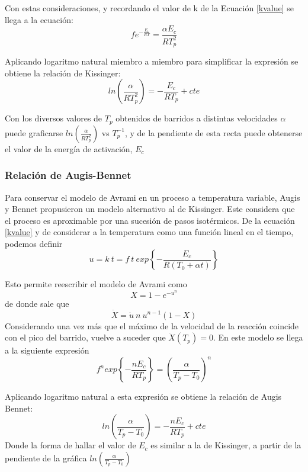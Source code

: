 \documentclass[12pt]{article}
\theoremstyle{definition}
\theoremstyle{remark}
\begin{document}
Con estas consideraciones, y recordando el valor de k de la Ecuación \ref{kvalue} se llega a la ecuación:
\begin{equation}
	fe^{-\frac{E_c}{RT}} = \frac{\alpha E_c}{R T_p^2}
\end{equation}

Aplicando logaritmo natural miembro a miembro para simplificar la expresión se obtiene la relación de Kissinger:
\begin{equation}
	ln(\frac{\alpha}{R T_p^2}) = -\frac{E_c}{RT_p} + cte
\end{equation}

Con los diversos valores de $T_p$ obtenidos de barridos a distintas velocidades $\alpha$ puede graficarse $ln(\frac{\alpha}{R T_p^2})$ vs $T_p^{-1}$, y de la pendiente de esta recta puede obtenerse el valor de la energía de activación, $E_c$

\subsubsection{Relación de Augis-Bennet}
Para conservar el modelo de Avrami en un proceso a temperatura variable, Augis y Bennet propusieron un modelo alternativo al de Kissinger. Este considera que el proceso es aproximable por una sucesión de pasos isotérmicos.
De la ecuación \ref{kvalue} y de considerar a la temperatura como una función lineal en el tiempo, podemos definir
\begin{equation}
	u = k\: t = f\: t\: exp \left\lbrace -\frac{E_c}{R(T_0 + \alpha t)} \right\rbrace
\end{equation}

Esto permite reescribir el modelo de Avrami como 
\begin{equation}
	X = 1-e^{-u^{n}}
\end{equation}
de donde sale que
\begin{equation}
	\dot{X} = \dot{u}\: n\: u^{n-1}(1-X)
\end{equation}
Considerando una vez más que el máximo de la velocidad de la reacción coincide con el pico del barrido, vuelve a suceder que $\ddot{X}(T_p) = 0$. En este modelo se llega a la siguiente expresión
\begin{equation}
	f^n exp \left\lbrace -\frac{n E_c}{RT_p} \right\rbrace = (\frac{\alpha}{T_p - T_0})^n
\end{equation}

Aplicando logaritmo natural a esta expresión se obtiene la relación de Augis Bennet:
\begin{equation}
	ln(\frac{\alpha}{T_p - T_0}) = -\frac{n E_c}{RT_p} + cte
\end{equation}
Donde la forma de hallar el valor de $E_c$ es similar a la de Kissinger, a partir de la pendiente de la gráfica $ln(\frac{\alpha}{T_p - T_0})$
\end{document}
